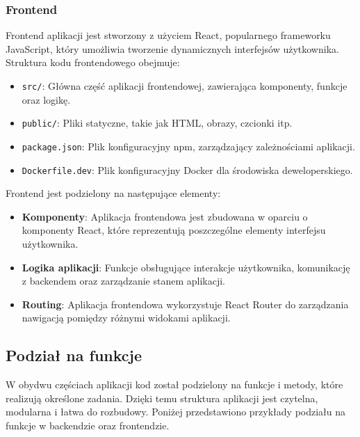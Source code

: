 \subsubsection{Frontend}
Frontend aplikacji jest stworzony z użyciem React, popularnego frameworku JavaScript, który umożliwia tworzenie dynamicznych interfejsów użytkownika. Struktura kodu frontendowego obejmuje:
\begin{itemize}
    \item \texttt{src/}: Główna część aplikacji frontendowej, zawierająca komponenty, funkcje oraz logikę.
    \item \texttt{public/}: Pliki statyczne, takie jak HTML, obrazy, czcionki itp.
    \item \texttt{package.json}: Plik konfiguracyjny npm, zarządzający zależnościami aplikacji.
    \item \texttt{Dockerfile.dev}: Plik konfiguracyjny Docker dla środowiska deweloperskiego.
\end{itemize}

Frontend jest podzielony na następujące elementy:
\begin{itemize}
    \item \textbf{Komponenty}: Aplikacja frontendowa jest zbudowana w oparciu o komponenty React, które reprezentują poszczególne elementy interfejsu użytkownika.
    \item \textbf{Logika aplikacji}: Funkcje obsługujące interakcje użytkownika, komunikację z backendem oraz zarządzanie stanem aplikacji.
    \item \textbf{Routing}: Aplikacja frontendowa wykorzystuje React Router do zarządzania nawigacją pomiędzy różnymi widokami aplikacji.
\end{itemize}

\subsection{Podział na funkcje}

W obydwu częściach aplikacji kod został podzielony na funkcje i metody, które realizują określone zadania. Dzięki temu struktura aplikacji jest czytelna, modularna i łatwa do rozbudowy. Poniżej przedstawiono przykłady podziału na funkcje w backendzie oraz frontendzie.

